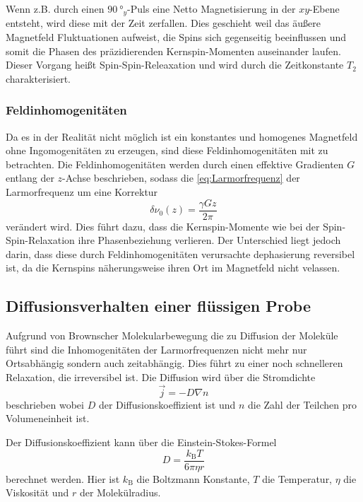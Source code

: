Wenn z.B. durch einen $\SI{90}{\degree}_y$-Puls eine Netto Magnetisierung in der $xy$-Ebene entsteht, wird diese mit der Zeit zerfallen.
Dies geschieht weil das äußere Magnetfeld Fluktuationen aufweist, die Spins sich gegenseitig beeinflussen und somit die Phasen des präzidierenden Kernspin-Momenten auseinander laufen.
Dieser Vorgang heißt Spin-Spin-Releaxation und wird durch die Zeitkonstante $T_2$ charakterisiert.

\subsubsection{Feldinhomogenitäten}
\label{sssec:Feldinhomogenitäten}

Da es in der Realität nicht möglich ist ein konstantes und homogenes Magnetfeld ohne Ingomogenitäten zu erzeugen,
sind diese Feldinhomogenitäten mit zu betrachten.
Die Feldinhomogenitäten werden durch einen effektive Gradienten $G$ entlang der $z$-Achse beschrieben, 
sodass die \autoref{eq:Larmorfrequenz} der Larmorfrequenz um eine Korrektur 
\begin{equation}
    \delta \nu_0(z) = \frac{\gamma G z}{2\pi}
    \label{eq:gradient_korrektur}
\end{equation}
verändert wird.
Dies führt dazu, dass die Kernspin-Momente wie bei der Spin-Spin-Relaxation ihre Phasenbeziehung verlieren.
Der Unterschied liegt jedoch darin, dass diese durch Feldinhomogenitäten verursachte dephasierung reversibel ist, da die Kernspins näherungsweise ihren Ort im Magnetfeld nicht velassen.

\subsection{Diffusionsverhalten einer flüssigen Probe}
\label{ssec:Diffusionsverhalten}

Aufgrund von Brownscher Molekularbewegung die zu Diffusion der Moleküle führt sind die Inhomogenitäten der Larmorfrequenzen nicht mehr nur
Ortsabhängig sondern auch zeitabhängig.
Dies führt zu einer noch schnelleren Relaxation, die irreversibel ist.
Die Diffusion wird über die Stromdichte 
\begin{equation}
    \vec{j} = -D \nabla n
\end{equation}
beschrieben wobei $D$ der Diffusionskoeffizient ist und $n$ die Zahl der Teilchen pro Volumeneinheit ist.

Der Diffusionskoeffizient kann über die Einstein-Stokes-Formel
\begin{equation}
    D = \frac{k_\text{B} T}{6 \pi \eta r}
    \label{eq:Einstein_Stokes}
\end{equation}
berechnet werden.
Hier ist $k_\text{B}$ die Boltzmann Konstante, $T$ die Temperatur, $\eta$ die Viskosität und $r$ der Molekülradius.

